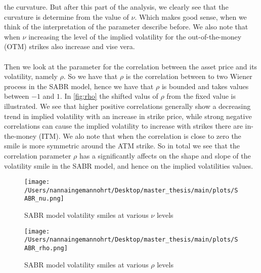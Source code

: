 the curvature. But after this part of the analysis, we clearly see that the curvature is determine from the value
of $\nu$. Which makes good sense, when we think of the interpretation of the parameter describe before.
We also note that when $\nu$  increasing the level of the implied volatility for the 
out-of-the-money (OTM) strikes also increase and vise vera.
\\\\
Then we look at the parameter for the correlation between the asset price and its volatility, namely $\rho$.
So we have that $\rho$ is the correlation between to two Wiener process in the SABR model, hence we have
that $\rho$ is bounded and takes values between $-1$ and $1$. In \autoref{fig:rho} the shifted valus of $\rho$
from the fixed value is illustrated. 
We see that higher positive correlations generally show a decreasing trend in implied volatility with an increase in strike price, 
while strong negative correlations can cause the implied volatility to increase with strikes there are in-the-money (ITM).
We alo note that when the correlation is close to zero the smile is more symmetric around the ATM strike. 
So in total we see that the correlation parameter $\rho$ has a significantly affects on the shape and slope of
the volatility smile in the SABR model, and hence on the implied volatilities values.
\begin{figure}[htbp]
    \centering
    \texttt{[image: /Users/nannaingemannohrt/Desktop/master\_thesis/main/plots/SABR\_nu.png]}
    \caption{SABR model volatility smiles at various $\nu$ levels}
    \label{fig:nu}
\end{figure}

\begin{figure}[htbp]
    \centering
    \texttt{[image: /Users/nannaingemannohrt/Desktop/master\_thesis/main/plots/SABR\_rho.png]}
    \caption{SABR model volatility smiles at various $\rho$ levels}
    \label{fig:rho}
\end{figure}


